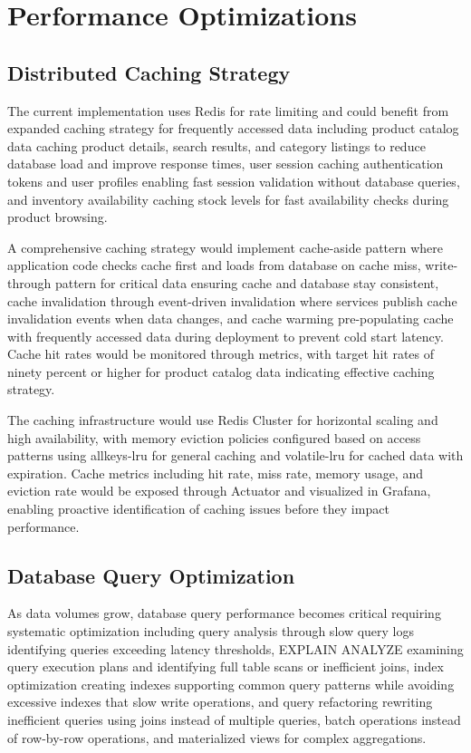 \section{Performance Optimizations}

\subsection{Distributed Caching Strategy}

The current implementation uses Redis for rate limiting and could benefit from expanded caching strategy for frequently accessed data including product catalog data caching product details, search results, and category listings to reduce database load and improve response times, user session caching authentication tokens and user profiles enabling fast session validation without database queries, and inventory availability caching stock levels for fast availability checks during product browsing.

A comprehensive caching strategy would implement cache-aside pattern where application code checks cache first and loads from database on cache miss, write-through pattern for critical data ensuring cache and database stay consistent, cache invalidation through event-driven invalidation where services publish cache invalidation events when data changes, and cache warming pre-populating cache with frequently accessed data during deployment to prevent cold start latency. Cache hit rates would be monitored through metrics, with target hit rates of ninety percent or higher for product catalog data indicating effective caching strategy.

The caching infrastructure would use Redis Cluster for horizontal scaling and high availability, with memory eviction policies configured based on access patterns using allkeys-lru for general caching and volatile-lru for cached data with expiration. Cache metrics including hit rate, miss rate, memory usage, and eviction rate would be exposed through Actuator and visualized in Grafana, enabling proactive identification of caching issues before they impact performance.

\subsection{Database Query Optimization}

As data volumes grow, database query performance becomes critical requiring systematic optimization including query analysis through slow query logs identifying queries exceeding latency thresholds, EXPLAIN ANALYZE examining query execution plans and identifying full table scans or inefficient joins, index optimization creating indexes supporting common query patterns while avoiding excessive indexes that slow write operations, and query refactoring rewriting inefficient queries using joins instead of multiple queries, batch operations instead of row-by-row operations, and materialized views for complex aggregations.

